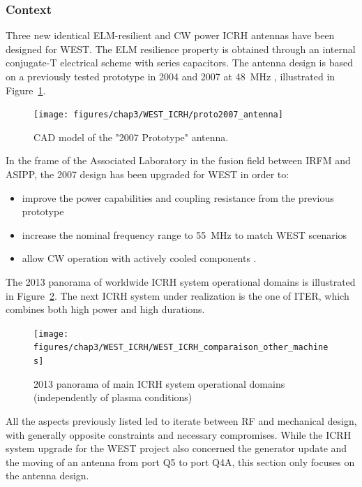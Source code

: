 \subsubsection{Context}
Three new identical ELM-resilient and CW power ICRH antennas have been designed for WEST. The ELM resilience property is obtained through an internal conjugate-T electrical scheme with series capacitors. The antenna design is based on a previously tested prototype in 2004 and 2007 at 48~MHz , illustrated in Figure~\ref{fig:proto2007antenna}. 

\begin{figure}[h]
	\centering
	\texttt{[image: figures/chap3/WEST\_ICRH/proto2007\_antenna]}
	\caption{CAD model of the "2007 Prototype" antenna.}
	\label{fig:proto2007antenna}
\end{figure}

In the frame of the Associated Laboratory in the fusion field between IRFM and ASIPP, the 2007 design has been upgraded for WEST in order to: 
\begin{itemize}
	\item improve the power capabilities and coupling resistance from the previous prototype   
	\item increase the nominal frequency range to 55~MHz to match WEST scenarios
	\item allow CW operation with actively cooled components .
\end{itemize} 

The 2013 panorama of worldwide ICRH system operational domains is illustrated in Figure~\ref{fig:westicrhcomparaisonothermachines}. The next ICRH system under realization is the one of ITER, which combines both high power and high durations. 

\begin{figure}[h]
	\centering
	\texttt{[image: figures/chap3/WEST\_ICRH/WEST\_ICRH\_comparaison\_other\_machines]}
	\caption{2013 panorama of main ICRH system operational domains (independently of plasma conditions)}
	\label{fig:westicrhcomparaisonothermachines}
\end{figure}

All the aspects previously listed led to iterate between RF and mechanical design, with generally opposite constraints and necessary compromises. While the ICRH system upgrade for the WEST project also concerned the generator update and the moving of an antenna from port Q5 to port Q4A, this section only focuses on the antenna design. 


